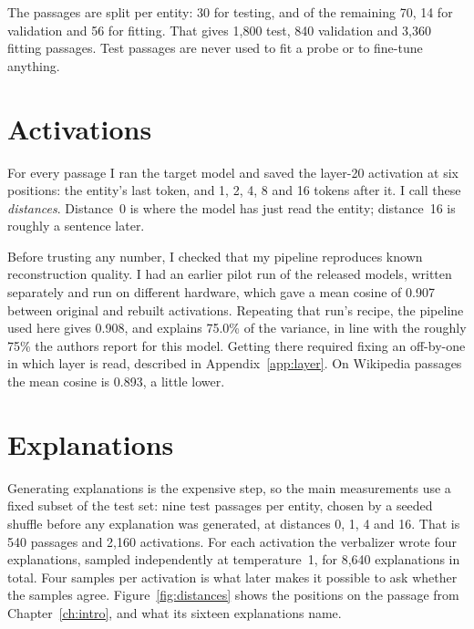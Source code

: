 The passages are split per entity: 30 for testing, and of the remaining 70, 14 for validation and 56 for
fitting. That gives 1{,}800 test, 840 validation and 3{,}360 fitting passages. Test passages are never used
to fit a probe or to fine-tune anything.

\section{Activations}

For every passage I ran the target model and saved the layer-20 activation at six positions: the entity's
last token, and 1, 2, 4, 8 and 16 tokens after it. I call these \emph{distances}. Distance~0 is where the
model has just read the entity; distance~16 is roughly a sentence later.

Before trusting any number, I checked that my pipeline reproduces known reconstruction quality. I had an
earlier pilot run of the released models, written separately and run on different hardware, which gave a
mean cosine of 0.907 between original and rebuilt activations. Repeating that run's recipe, the pipeline
used here gives 0.908, and explains 75.0\% of the variance, in line with the roughly 75\% the authors report
for this model. Getting there required fixing an off-by-one in which layer is read, described in
Appendix~\ref{app:layer}. On Wikipedia passages the mean cosine is 0.893, a little lower.

\section{Explanations}

Generating explanations is the expensive step, so the main measurements use a fixed subset of the test set:
nine test passages per entity, chosen by a seeded shuffle before any explanation was generated, at distances
0, 1, 4 and 16. That is 540 passages and 2{,}160 activations. For each activation the verbalizer wrote four
explanations, sampled independently at temperature~1, for 8{,}640 explanations in total. Four samples per
activation is what later makes it possible to ask whether the samples agree.
Figure~\ref{fig:distances} shows the positions on the passage from Chapter~\ref{ch:intro}, and what its
sixteen explanations name.

